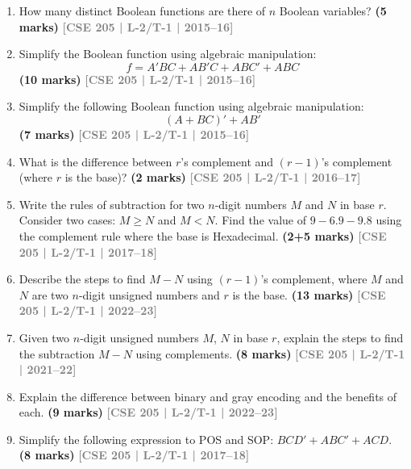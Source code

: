 \documentclass[12pt,a4paper]{article}
\newcommand{\yr}[1]{\hfill\textcolor{gray}{\small\textbf{[#1]}}}
\newcommand{\mk}[1]{\textcolor{orange!70!black}{\small\textbf{(#1 marks)}}}
\begin{document}
\begin{enumerate}
\item How many distinct Boolean functions are there of $n$ Boolean variables?
\mk{5} \yr{CSE 205 | L-2/T-1 | 2015--16}


\item Simplify the Boolean function using algebraic manipulation:
\[ f = A'BC + AB'C + ABC' + ABC \]
\mk{10} \yr{CSE 205 | L-2/T-1 | 2015--16}


\item Simplify the following Boolean function using algebraic manipulation:
\[ (A + BC)' + AB' \]
\mk{7} \yr{CSE 205 | L-2/T-1 | 2015--16}


\item What is the difference between $r$'s complement and $(r-1)$'s complement (where $r$ is the base)? 
\mk{2} \yr{CSE 205 | L-2/T-1 | 2016--17}

\item Write the rules of subtraction for two $n$-digit numbers $M$ and $N$ in base $r$. Consider two cases: $M \geq N$ and $M < N$. Find the value of $9 - 6.9 - 9.8$ using the complement rule where the base is Hexadecimal.
\mk{2+5} \yr{CSE 205 | L-2/T-1 | 2017--18}

\item Describe the steps to find $M - N$ using $(r-1)$'s complement, where $M$ and $N$ are two $n$-digit unsigned numbers and $r$ is the base.
\mk{13} \yr{CSE 205 | L-2/T-1 | 2022--23}

\item Given two $n$-digit unsigned numbers $M$, $N$ in base $r$, explain the steps to find the subtraction $M - N$ using complements.
\mk{8} \yr{CSE 205 | L-2/T-1 | 2021--22}

\item Explain the difference between binary and gray encoding and the benefits of each.
\mk{9} \yr{CSE 205 | L-2/T-1 | 2022--23}


\item Simplify the following expression to POS and SOP: $BCD' + ABC' + ACD$.
\mk{8} \yr{CSE 205 | L-2/T-1 | 2017--18}


\end{enumerate}
\end{document}
